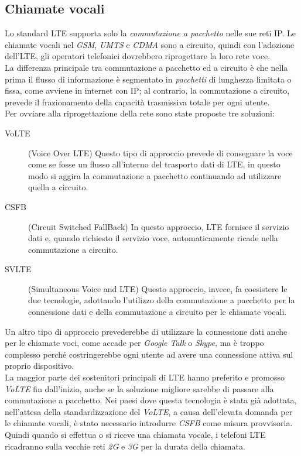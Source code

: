  \subsection{Chiamate vocali}
 \label{sub:voice}
Lo standard \ac{LTE} supporta solo la \emph{commutazione a pacchetto} nelle sue reti IP. Le chiamate vocali nel \emph{GSM}, \emph{UMTS} e 
\emph{CDMA} sono a circuito, quindi con l'adozione dell'\ac{LTE}, gli operatori telefonici dovrebbero riprogettare la loro rete voce. \\
La differenza principale tra commutazione a pacchetto ed a circuito è che nella prima il flusso di informazione è segmentato in 
\emph{pacchetti} di lunghezza limitata o fissa, come avviene in internet con IP; al contrario, la commutazione a circuito, prevede il 
frazionamento della capacità trasmissiva totale per ogni utente. \\
Per ovviare alla riprogettazione della rete sono state proposte tre soluzioni:
\begin{description}
 \item[VoLTE] (Voice Over \ac{LTE}) Questo tipo di approccio prevede di consegnare la voce come se fosse un flusso all'interno del 
 trasporto dati di \ac{LTE}, in questo modo si aggira la commutazione a pacchetto continuando ad utilizzare quella a circuito.
 \item[CSFB] (Circuit Switched FallBack) In questo approccio, \ac{LTE} fornisce il servizio dati e, quando richiesto il servizio voce, 
 automaticamente ricade nella commutazione a circuito.
 \item[SVLTE] (Simultaneous Voice and \ac{LTE}) Questo approccio, invece, fa coesistere le due tecnologie, adottando l'utilizzo della 
 commutazione a pacchetto per la connessione dati e della commutazione a circuito per le chiamate vocali. 
\end{description}
Un altro tipo di approccio prevederebbe di utilizzare la connessione dati anche per le chiamate voci, come accade per \emph{Google Talk} o
\emph{Skype}, ma è troppo complesso perché costringerebbe ogni utente ad avere una connessione attiva sul proprio dispositivo. \\
La maggior parte dei sostenitori principali di \ac{LTE} hanno preferito e promosso \emph{VoLTE} fin dall'inizio, anche se la soluzione 
migliore sarebbe di passare alla commutazione a pacchetto.
Nei paesi dove questa tecnologia è stata già adottata, nell'attesa della standardizzazione del \emph{VoLTE}, a causa dell'elevata
domanda per le chiamate vocali, è stato necessario introdurre \emph{CSFB} come misura provvisoria. Quindi quando si effettua o si riceve
una chiamata vocale, i telefoni \ac{LTE} ricadranno sulla vecchie reti \emph{2G} e \emph{3G} per la durata della chiamata. \\


